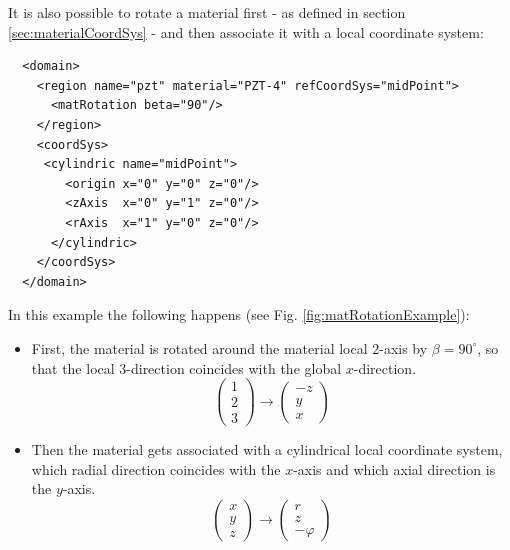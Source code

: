 It is also possible to rotate a material first - as defined in section \ref{sec:materialCoordSys} - and then associate it with a local coordinate system:
\begin{verbatim}
  <domain>
    <region name="pzt" material="PZT-4" refCoordSys="midPoint">
      <matRotation beta="90"/>
    </region>
    <coordSys>
     <cylindric name="midPoint"> 
        <origin x="0" y="0" z="0"/>
        <zAxis  x="0" y="1" z="0"/>
        <rAxis  x="1" y="0" z="0"/>
      </cylindric>
    </coordSys>
  </domain>
\end{verbatim}
In this example the following happens (see Fig. \ref{fig:matRotationExample}):
\begin{itemize}
 \item First, the material is rotated around the material local $2$-axis by $\beta=90^\circ$, so that the local $3$-direction coincides with the global $x$-direction.
\begin{equation}
\left( 
\begin{array}{c}
  1 \\ 2 \\ 3 
 \end{array}
\right)
\rightarrow
\left(
\begin{array}{c}
  -z \\ y \\ x 
 \end{array}
\right)
\end{equation}
\item Then the material gets associated with a cylindrical local coordinate system, which radial direction coincides with the $x$-axis and which axial direction is the $y$-axis.
\begin{equation}
\left( 
\begin{array}{c}
  x \\ y \\ z 
 \end{array}
\right)
\rightarrow
\left(
\begin{array}{c}
  r \\ z \\ -\varphi 
 \end{array}
\right)
\end{equation}

\end{itemize}

